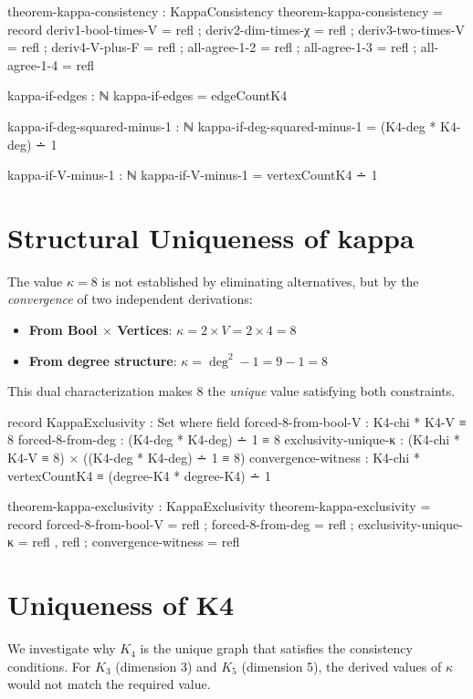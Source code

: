 \documentclass[11pt,a4paper]{book}
\def\texorpdfstring#1#2{#2}%
\begin{document}
\begin{code}
theorem-kappa-consistency : KappaConsistency
theorem-kappa-consistency = record
  { deriv1-bool-times-V  = refl
  ; deriv2-dim-times-χ   = refl
  ; deriv3-two-times-V   = refl
  ; deriv4-V-plus-F      = refl
  ; all-agree-1-2        = refl
  ; all-agree-1-3        = refl
  ; all-agree-1-4        = refl
  }

kappa-if-edges : ℕ
kappa-if-edges = edgeCountK4

kappa-if-deg-squared-minus-1 : ℕ
kappa-if-deg-squared-minus-1 = (K4-deg * K4-deg) ∸ 1

kappa-if-V-minus-1 : ℕ
kappa-if-V-minus-1 = vertexCountK4 ∸ 1
\end{code}

\section{Structural Uniqueness of \texorpdfstring{$\kappa$}{kappa}}

The value $\kappa = 8$ is not established by eliminating alternatives, but by the \emph{convergence} of two independent derivations:
\begin{itemize}
\item \textbf{From Bool $\times$ Vertices}: $\kappa = 2 \times V = 2 \times 4 = 8$
\item \textbf{From degree structure}: $\kappa = \deg^2 - 1 = 9 - 1 = 8$
\end{itemize}
This dual characterization makes 8 the \emph{unique} value satisfying both constraints.

\begin{code}
record KappaExclusivity : Set where
  field
    forced-8-from-bool-V   : K4-chi * K4-V ≡ 8
    forced-8-from-deg      : (K4-deg * K4-deg) ∸ 1 ≡ 8
    exclusivity-unique-κ   : (K4-chi * K4-V ≡ 8) × ((K4-deg * K4-deg) ∸ 1 ≡ 8)
    convergence-witness    : K4-chi * vertexCountK4 ≡ (degree-K4 * degree-K4) ∸ 1

theorem-kappa-exclusivity : KappaExclusivity
theorem-kappa-exclusivity = record
  { forced-8-from-bool-V = refl
  ; forced-8-from-deg = refl
  ; exclusivity-unique-κ = refl , refl
  ; convergence-witness = refl
  }
\end{code}

\section{Uniqueness of K4}

We investigate why $K_4$ is the unique graph that satisfies the consistency conditions. For $K_3$ (dimension 3) and $K_5$ (dimension 5), the derived values of $\kappa$ would not match the required value.
\end{document}

